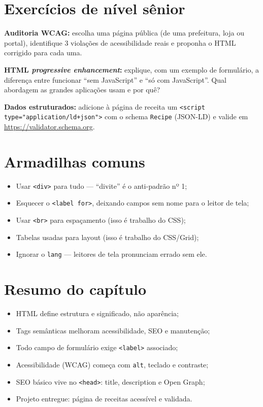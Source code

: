 \section{Exercícios de nível sênior}

\begin{seniores}
  \item \textbf{Auditoria WCAG:} escolha uma página pública (de uma prefeitura,
  loja ou portal), identifique 3 violações de acessibilidade reais e proponha
  o HTML corrigido para cada uma.
  \item \textbf{HTML \emph{progressive enhancement}:} explique, com um exemplo
  de formulário, a diferença entre funcionar ``sem JavaScript'' e ``só com
  JavaScript''. Qual abordagem as grandes aplicações usam e por quê?
  \item \textbf{Dados estruturados:} adicione à página de receita um
  \texttt{<script type="application/ld+json">} com o schema
  \texttt{Recipe} (JSON-LD) e valide em \url{https://validator.schema.org}.
\end{seniores}

\section{Armadilhas comuns}

\begin{itemize}[leftmargin=*, itemsep=0.4em]
  \item Usar \texttt{<div>} para tudo — ``divite'' é o anti-padrão nº 1;
  \item Esquecer o \texttt{<label for>}, deixando campos sem nome para o leitor de tela;
  \item Usar \texttt{<br>} para espaçamento (isso é trabalho do CSS);
  \item Tabelas usadas para layout (isso é trabalho do CSS/Grid);
  \item Ignorar o \texttt{lang} — leitores de tela pronunciam errado sem ele.
\end{itemize}

\section{Resumo do capítulo}

\begin{itemize}[leftmargin=*, itemsep=0.3em]
  \item HTML define estrutura e significado, não aparência;
  \item Tags semânticas melhoram acessibilidade, SEO e manutenção;
  \item Todo campo de formulário exige \texttt{<label>} associado;
  \item Acessibilidade (WCAG) começa com \texttt{alt}, teclado e contraste;
  \item SEO básico vive no \texttt{<head>}: title, description e Open Graph;
  \item Projeto entregue: página de receitas acessível e validada.
\end{itemize}

